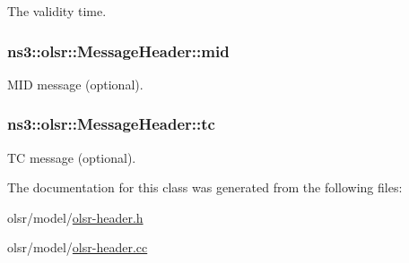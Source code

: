 The validity time. 

\subsubsection[{\texorpdfstring{mid}{mid}}]{ ns3\+::olsr\+::\+Message\+Header\+::mid}\hypertarget{classns3_1_1olsr_1_1MessageHeader_a0009ae1f66c6b8a878564e2053eff3cb}{}\label{classns3_1_1olsr_1_1MessageHeader_a0009ae1f66c6b8a878564e2053eff3cb}


M\+ID message (optional). 

\subsubsection[{\texorpdfstring{tc}{tc}}]{ ns3\+::olsr\+::\+Message\+Header\+::tc}\hypertarget{classns3_1_1olsr_1_1MessageHeader_a8f66e54e1c5bdbcc753d53cbc079a324}{}\label{classns3_1_1olsr_1_1MessageHeader_a8f66e54e1c5bdbcc753d53cbc079a324}


TC message (optional). 



The documentation for this class was generated from the following files\+:\begin{DoxyCompactItemize}
\item 
olsr/model/\hyperlink{olsr-header_8h}{olsr-\/header.\+h}\item 
olsr/model/\hyperlink{olsr-header_8cc}{olsr-\/header.\+cc}\end{DoxyCompactItemize}
